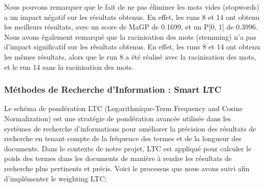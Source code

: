 \documentclass[a4paper, 12pt]{article}
\begin{document}
Nous pouvons remarquer que le fait de ne pas éliminer les mots vides (stopwords) 
a un impact négatif sur les résultats obtenus. En effet, les runs 8 et 14 ont obtenu les meilleurs résultats,
avec un score de MaGP de 0.1699, et un P[0, 1] de 0.3996. Nous avons également remarqué que la racinisation des mots (stemming)
n'a pas d'impact significatif sur les résultats obtenus. En effet, les runs 8 et 14 ont obtenu les mêmes résultats,
alors que le run 8 a été réalisé avec la racinisation des mots, et le run 14 sans la racinisation des mots.







\newpage

\subsubsection{Méthodes de Recherche d'Information : Smart LTC}
Le schéma de pondération LTC (Logarithmique-Term Frequency and Cosine Normalization) est une stratégie de pondération avancée utilisée dans les systèmes de recherche d'informations pour améliorer la précision des résultats de recherche en tenant compte de la fréquence des termes et de la longueur des documents. 
Dans le contexte de notre projet, LTC est appliqué pour calculer le poids des termes dans les documents de manière à rendre les résultats de recherche plus pertinents et précis. Voici le processus que nous avons suivi afin d'implémenter le weighting LTC:
\end{document}
